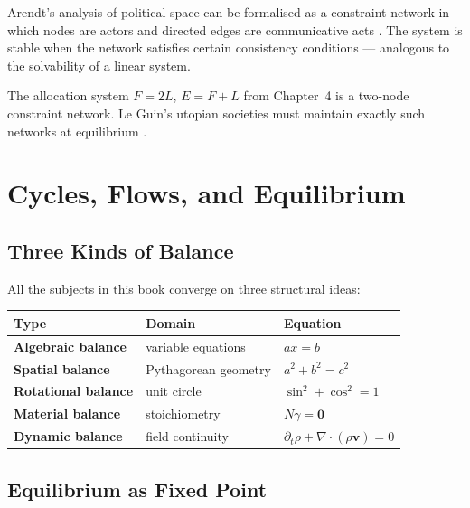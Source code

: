 \documentclass[11pt, openany]{book}
\theoremstyle{plain}
\theoremstyle{definition}
\theoremstyle{remark}
\begin{document}
\begin{myexample}
Arendt's analysis of political space can be formalised as a constraint network
in which nodes are actors and directed edges are communicative acts
\citep{Arendt1958}. The system is stable when the network satisfies certain
consistency conditions --- analogous to the solvability of a linear system.
\end{myexample}

\begin{myexample}
The allocation system $F=2L$, $E=F+L$ from Chapter~4 is a two-node constraint
network. Le Guin's utopian societies must maintain exactly such networks at
equilibrium \citep{LeGuin1974}.
\end{myexample}

\chapter{Cycles, Flows, and Equilibrium}

\section{Three Kinds of Balance}

All the subjects in this book converge on three structural ideas:

\begin{center}
\renewcommand{\arraystretch}{1.6}
\begin{tabular}{>{\bfseries}p{3cm} p{4cm} p{5cm}}
\toprule
\color{ctBlue}Type & \color{ctBlue}Domain & \color{ctBlue}Equation \\
\midrule
Algebraic balance  & variable equations     & $ax=b$ \\
Spatial balance    & Pythagorean geometry   & $a^2+b^2=c^2$ \\
Rotational balance & unit circle            & $\sin^2+\cos^2=1$ \\
Material balance   & stoichiometry          & $N\gamma=\mathbf{0}$ \\
Dynamic balance    & field continuity       & $\partial_t\rho+\nabla\cdot(\rho\mathbf{v})=0$ \\
\bottomrule
\end{tabular}
\end{center}

\section{Equilibrium as Fixed Point}
\end{document}
